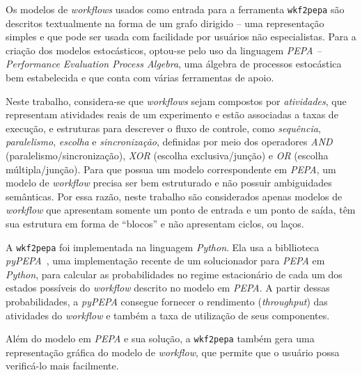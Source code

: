 \documentclass[a4paper,10pt]{article}
\begin{document}
        Os modelos de \emph{workflows} usados como entrada para a ferramenta \texttt{wkf2pepa} são descritos textualmente na forma de um grafo dirigido -- uma representação simples e que pode ser usada com facilidade por usuários não especialistas.
        Para a criação dos modelos estocásticos, optou-se pelo uso da linguagem \emph{PEPA -- Performance Evaluation Process Algebra}, uma álgebra de processos estocástica bem estabelecida e que conta com várias ferramentas de apoio.

         Neste trabalho, considera-se que \emph{workflows} sejam compostos por \emph{atividades}, que representam atividades reais de um experimento e estão associadas a taxas de execução, e estruturas para descrever o fluxo de controle, como \emph{sequência}, \emph{paralelismo}, \emph{escolha} e \emph{sincronização}, definidas por meio dos operadores \emph{AND} (paralelismo/sincronização), \emph{XOR} (escolha exclusiva/junção) e \emph{OR} (escolha múltipla/junção).
        Para que possua um modelo correspondente em \emph{PEPA}, um modelo de \emph{workflow} precisa ser bem estruturado e não possuir ambiguidades semânticas. Por essa razão, neste trabalho são considerados apenas modelos de \emph{workflow} que apresentam somente um ponto de entrada e um ponto de saída, têm sua estrutura em forma de ``blocos'' e não apresentam ciclos, ou laços.

        A \texttt{wkf2pepa} foi implementada na linguagem \emph{Python}. Ela usa a bibllioteca \emph{pyPEPA}~\cite{web:pypepa}, uma implementação recente de um solucionador para \emph{PEPA} em \emph{Python}, para calcular as probabilidades no regime estacion\'ario de cada um dos estados poss\'iveis do \emph{workflow} descrito no modelo em \emph{PEPA}. A partir dessas probabilidades, a \emph{pyPEPA} consegue fornecer o rendimento (\emph{throughput}) das atividades do \emph{workflow} e também a taxa de utilizaç\~ao de seus componentes.

        Além do modelo em \emph{PEPA} e sua solução, a \texttt{wkf2pepa} também gera uma representação gráfica do modelo de \emph{workflow}, que permite que o usuário possa verificá-lo mais facilmente.
\end{document}
